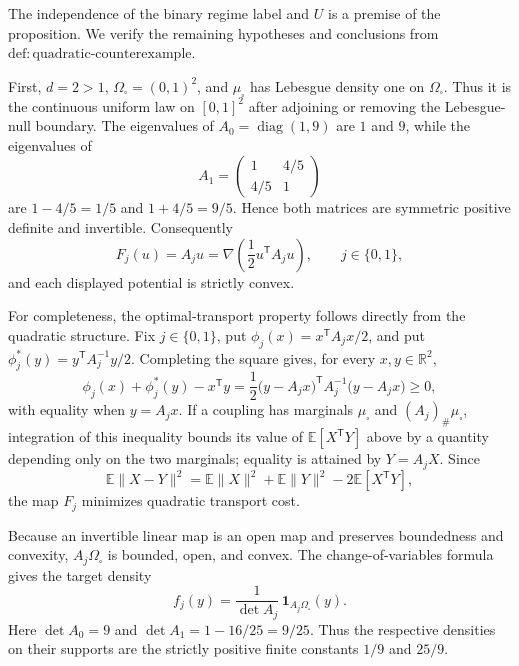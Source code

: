 The independence of the binary regime label and \(U\) is a premise of the proposition.  We verify the remaining hypotheses and conclusions from \(\mathrm{def:quadratic\text{-}counterexample}\).

First, \(d=2>1\), \(\Omega_{\square}=(0,1)^2\), and \(\mu_{\square}\) has Lebesgue density one on \(\Omega_{\square}\).  Thus it is the continuous uniform law on \([0,1]^2\) after adjoining or removing the Lebesgue-null boundary.  The eigenvalues of \(A_0=\operatorname{diag}(1,9)\) are \(1\) and \(9\), while the eigenvalues of
\[
A_1=\begin{pmatrix}1&4/5\\4/5&1\end{pmatrix}
\]
are \(1-4/5=1/5\) and \(1+4/5=9/5\).  Hence both matrices are symmetric positive definite and invertible.  Consequently
\[
F_j(u)=A_j u=\nabla\!\left(\frac12u^{\mathsf T}A_j u\right),
\qquad j\in\{0,1\},
\]
and each displayed potential is strictly convex.

For completeness, the optimal-transport property follows directly from the quadratic structure.  Fix \(j\in\{0,1\}\), put \(\phi_j(x)=x^{\mathsf T}A_jx/2\), and put \(\phi_j^*(y)=y^{\mathsf T}A_j^{-1}y/2\).  Completing the square gives, for every \(x,y\in\mathbb R^2\),
\[
\phi_j(x)+\phi_j^*(y)-x^{\mathsf T}y
=\frac12\bigl(y-A_jx\bigr)^{\mathsf T}A_j^{-1}
       \bigl(y-A_jx\bigr)\ge 0,
\]
with equality when \(y=A_jx\).  If a coupling has marginals \(\mu_{\square}\) and \((A_j)_{\#}\mu_{\square}\), integration of this inequality bounds its value of \(\mathbb E[X^{\mathsf T}Y]\) above by a quantity depending only on the two marginals; equality is attained by \(Y=A_jX\).  Since
\[
\mathbb E\lVert X-Y\rVert^2
=\mathbb E\lVert X\rVert^2+\mathbb E\lVert Y\rVert^2
 -2\mathbb E[X^{\mathsf T}Y],
\]
the map \(F_j\) minimizes quadratic transport cost.

Because an invertible linear map is an open map and preserves boundedness and convexity, \(A_j\Omega_{\square}\) is bounded, open, and convex.  The change-of-variables formula gives the target density
\[
f_j(y)=\frac{1}{\det A_j}\,
\mathbf 1_{A_j\Omega_{\square}}(y).
\]
Here \(\det A_0=9\) and \(\det A_1=1-16/25=9/25\).  Thus the respective densities on their supports are the strictly positive finite constants \(1/9\) and \(25/9\).

